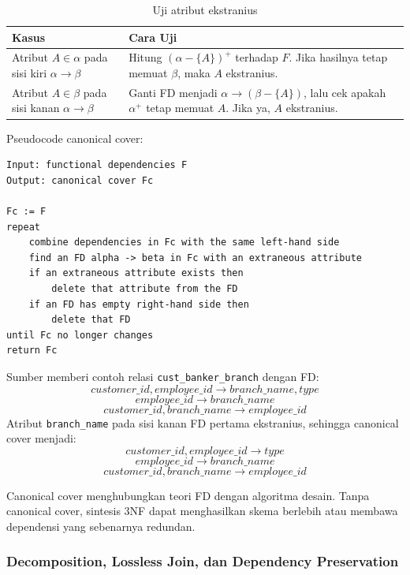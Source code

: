 \begin{table}[H]
\centering
\begin{tabularx}{\textwidth}{|L{0.30\textwidth}|X|}
\hline
\textbf{Kasus} & \textbf{Cara Uji} \\
\hline
Atribut \(A \in \alpha\) pada sisi kiri \(\alpha \rightarrow \beta\) & Hitung \((\alpha-\{A\})^+\) terhadap \(F\). Jika hasilnya tetap memuat \(\beta\), maka \(A\) ekstranius. \\
\hline
Atribut \(A \in \beta\) pada sisi kanan \(\alpha \rightarrow \beta\) & Ganti FD menjadi \(\alpha \rightarrow (\beta-\{A\})\), lalu cek apakah \(\alpha^+\) tetap memuat \(A\). Jika ya, \(A\) ekstranius. \\
\hline
\end{tabularx}
\caption{Uji atribut ekstranius}
\label{tab:extraneous-attribute}
\end{table}

Pseudocode canonical cover:
\begin{lstlisting}[caption={Pseudocode canonical cover}, label={lst:canonical-cover}]
Input: functional dependencies F
Output: canonical cover Fc

Fc := F
repeat
    combine dependencies in Fc with the same left-hand side
    find an FD alpha -> beta in Fc with an extraneous attribute
    if an extraneous attribute exists then
        delete that attribute from the FD
    if an FD has empty right-hand side then
        delete that FD
until Fc no longer changes
return Fc
\end{lstlisting}

Sumber memberi contoh relasi \texttt{cust\_banker\_branch} dengan FD:
\[
    customer\_id, employee\_id \rightarrow branch\_name, type
\]
\[
    employee\_id \rightarrow branch\_name
\]
\[
    customer\_id, branch\_name \rightarrow employee\_id
\]
Atribut \texttt{branch\_name} pada sisi kanan FD pertama ekstranius, sehingga canonical cover menjadi:
\[
    customer\_id, employee\_id \rightarrow type
\]
\[
    employee\_id \rightarrow branch\_name
\]
\[
    customer\_id, branch\_name \rightarrow employee\_id
\]

Canonical cover menghubungkan teori FD dengan algoritma desain. Tanpa canonical cover, sintesis 3NF dapat menghasilkan skema berlebih atau membawa dependensi yang sebenarnya redundan.

\subsubsection{Decomposition, Lossless Join, dan Dependency Preservation}

